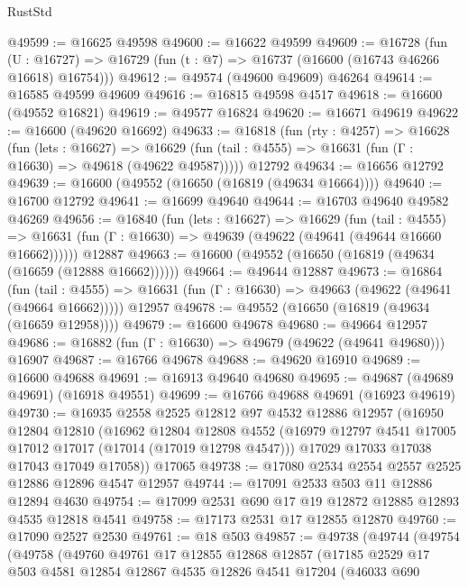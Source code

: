 \begin{lexlean}{RustStd}
\begin{coremodule}
{\begin{coremodule}
{{{{{{{{{{{{{{{{{{{{{{{{{{{{{{{{{{{{{{{{{{{{{{{{{{{{{{{@49599 := @16625 @49598
@49600 := @16622 @49599
@49609 := @16728
    (fun (U : @16727) => @16729 (fun (t : @7) => @16737 (@16600 (@16743 @46266 @16618) @16754)))
@49612 := @49574 (@49600 @49609) @46264
@49614 := @16585 @49599 @49609
@49616 := @16815 @49598 @4517
@49618 := @16600 (@49552 @16821)
@49619 := @49577 @16824
@49620 := @16671 @49619
@49622 := @16600 (@49620 @16692)
@49633 := @16818
    (fun (rty : @4257) =>
    @16628
      (fun (lets : @16627) =>
      @16629 (fun (tail : @4555) => @16631 (fun (Γ : @16630) => @49618 (@49622 @49587)))))
    @12792
@49634 := @16656 @12792
@49639 := @16600 (@49552 (@16650 (@16819 (@49634 @16664))))
@49640 := @16700 @12792
@49641 := @16699 @49640
@49644 := @16703 @49640 @49582 @46269
@49656 := @16840
    (fun (lets : @16627) =>
    @16629
      (fun (tail : @4555) =>
      @16631 (fun (Γ : @16630) => @49639 (@49622 (@49641 (@49644 @16660 @16662))))))
    @12887
@49663 := @16600 (@49552 (@16650 (@16819 (@49634 (@16659 (@12888 @16662))))))
@49664 := @49644 @12887
@49673 := @16864
    (fun (tail : @4555) => @16631 (fun (Γ : @16630) => @49663 (@49622 (@49641 (@49664 @16662)))))
    @12957
@49678 := @49552 (@16650 (@16819 (@49634 (@16659 @12958))))
@49679 := @16600 @49678
@49680 := @49664 @12957
@49686 := @16882 (fun (Γ : @16630) => @49679 (@49622 (@49641 @49680))) @16907
@49687 := @16766 @49678
@49688 := @49620 @16910
@49689 := @16600 @49688
@49691 := @16913 @49640 @49680
@49695 := @49687 (@49689 @49691) (@16918 @49551)
@49699 := @16766 @49688 @49691 (@16923 @49619)
@49730 := @16935
    @2558
    @2525
    @12812
    @97
    @4532
    @12886
    @12957
    (@16950
      @12804
      @12810
      (@16962
        @12804
        @12808
        @4552
        (@16979 @12797 @4541 @17005 @17012 @17017 (@17014 (@17019 @12798 @4547)))
        @17029
        @17033
        @17038
        @17043
        @17049
        @17058))
    @17065
@49738 := @17080 @2534 @2554 @2557 @2525 @12886 @12896 @4547 @12957
@49744 := @17091 @2533 @503 @11 @12886 @12894 @4630
@49754 := @17099 @2531 @690 @17 @19 @12872 @12885 @12893 @4535 @12818 @4541
@49758 := @17173 @2531 @17 @12855 @12870
@49760 := @17090 @2527 @2530
@49761 := @18 @503
@49857 := @49738
    (@49744
      (@49754
        (@49758
          (@49760
            @49761
            @17
            @12855
            @12868
            @12857
            (@17185
              @2529
              @17
              @503
              @4581
              @12854
              @12867
              @4535
              @12826
              @4541
              @17204
              (@46033
                @690
}}}}}}}}}}}}}}}}}}}}}}}}}}}}}}}}}}}}}}}}}}}}}}}}}}}}}}}
\end{coremodule}}
\end{coremodule}
\end{lexlean}
